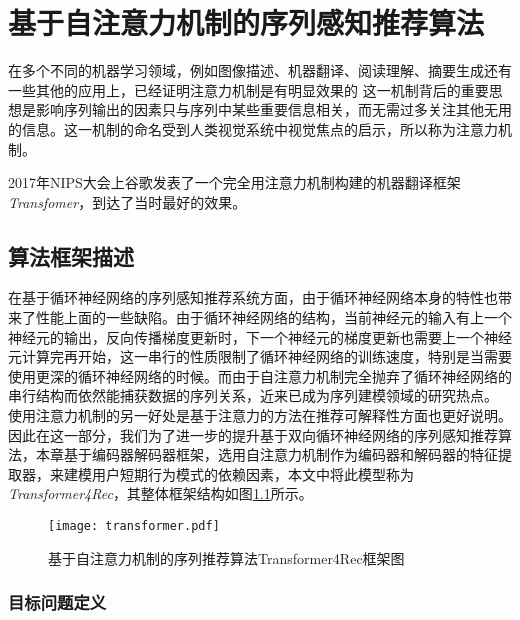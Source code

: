 ﻿%
\chapter{基于自注意力机制的序列感知推荐算法}

在多个不同的机器学习领域，例如图像描述、机器翻译、阅读理解、摘要生成还有一些其他的应用上，已经证明注意力机制是有明显效果的%
这一机制背后的重要思想是影响序列输出的因素只与序列中某些重要信息相关，而无需过多关注其他无用的信息。这一机制的命名受到人类视觉系统中视觉焦点的启示，所以称为注意力机制。

2017年NIPS大会上谷歌发表了一个完全用注意力机制构建的机器翻译框架\textit{Transfomer}，到达了当时最好的效果。
\section{算法框架描述}

在基于循环神经网络的序列感知推荐系统方面，由于循环神经网络本身的特性也带来了性能上面的一些缺陷。由于循环神经网络的结构，当前神经元的输入有上一个神经元的输出，反向传播梯度更新时，下一个神经元的梯度更新也需要上一个神经元计算完再开始，这一串行的性质限制了循环神经网络的训练速度，特别是当需要使用更深的循环神经网络的时候。而由于自注意力机制完全抛弃了循环神经网络的串行结构而依然能捕获数据的序列关系，近来已成为序列建模领域的研究热点。
使用注意力机制的另一好处是基于注意力的方法在推荐可解释性方面也更好说明。%
因此在这一部分，我们为了进一步的提升基于双向循环神经网络的序列感知推荐算法，本章基于编码器解码器框架，选用自注意力机制作为编码器和解码器的特征提取器，来建模用户短期行为模式的依赖因素，本文中将此模型称为\textit{Transformer4Rec}，其整体框架结构如图\ref{fig:transformer}所示。

\begin{figure}[htb]
  \centering
  \texttt{[image: transformer.pdf]}\\
  \caption{基于自注意力机制的序列推荐算法Transformer4Rec框架图}
  \label{fig:transformer}
\end{figure}

\subsection{目标问题定义}

